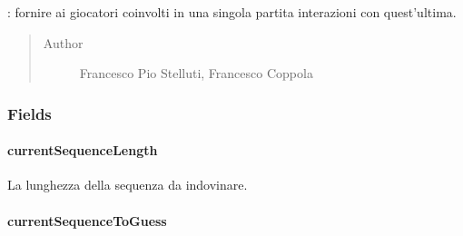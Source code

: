 \documentclass[letterpaper,10pt,italian]{sphinxmanual}
\begin{document}
\begin{fulllineitems}
\label{\detokenize{source/it/unicam/cs/pa/mastermind/ui/InteractionView:it.unicam.cs.pa.mastermind.ui.InteractionView}}
: fornire ai giocatori coinvolti in una singola partita interazioni con quest’ultima.
\begin{quote}\begin{description}
\item[{Author}] \leavevmode
Francesco Pio Stelluti, Francesco Coppola

\end{description}\end{quote}

\end{fulllineitems}



\subsubsection{Fields}
\label{\detokenize{source/it/unicam/cs/pa/mastermind/ui/InteractionView:fields}}

\paragraph{currentSequenceLength}
\label{\detokenize{source/it/unicam/cs/pa/mastermind/ui/InteractionView:currentsequencelength}}

\begin{fulllineitems}
\label{\detokenize{source/it/unicam/cs/pa/mastermind/ui/InteractionView:it.unicam.cs.pa.mastermind.ui.InteractionView.currentSequenceLength}}
La lunghezza della sequenza da indovinare.

\end{fulllineitems}



\paragraph{currentSequenceToGuess}
\label{\detokenize{source/it/unicam/cs/pa/mastermind/ui/InteractionView:currentsequencetoguess}}
\end{document}

